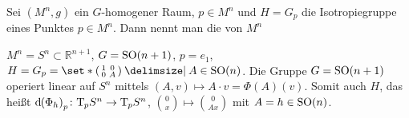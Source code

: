 \begin{definition}[{name=[Isotropiedarstellung]}]
	Sei $(M^n,g)$ ein $G$-homogener Raum, $p \in M^n$ und $H= G_p$ die Isotropiegruppe eines Punktes $p \in M^n$.
	Dann nennt man
	die  von $M^n$ 
\end{definition}

\begin{beispiel*}[{name=[Isotropiedarstellung]}]
	$M^n = S^n \subset \mathbb{R}^{n+1}$, $G = \operatorname{SO}(n+1)$, $p=e_1$, $H= G_p = \set*{\begin{psmallmatrix}
		1 & 0 \\ 0 & A
	\end{psmallmatrix} \given A \in \SO(n)}$.
	Die Gruppe $G = \operatorname{SO}(n+1)$ operiert linear auf $S^n$ mittels $(A,v) \mapsto A \cdot v = \Phi(A)(v)$.
	Somit auch $H$, das heißt $\mathd \enbrace*{\Phi_h}_p \colon \Tmap_p S^n \to \Tmap_p S^n$, $\binom{0}{x} \mapsto \binom{0}{Ax}$ mit $A=h \in \operatorname{SO}(n)$.
\end{beispiel*}

